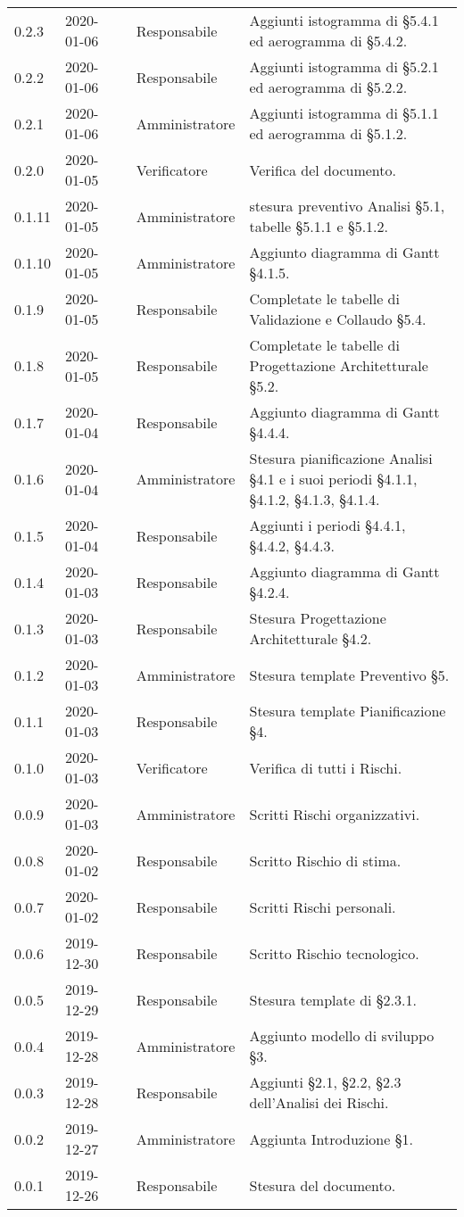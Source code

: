 {\begin{longtable}{C{2cm} C{2cm}  C{3cm}  C{3cm} C{4.4cm}}
0.2.3 & 2020-01-06 & \SE{} & Responsabile & Aggiunti istogramma di §5.4.1 ed aerogramma di §5.4.2. \\
0.2.2 & 2020-01-06 & \SE{} & Responsabile & Aggiunti istogramma di §5.2.1 ed aerogramma di §5.2.2. \\
0.2.1 & 2020-01-06 & \LD{} & Amministratore & Aggiunti istogramma di §5.1.1 ed aerogramma di §5.1.2. \\
0.2.0 & 2020-01-05 & \MC{} & Verificatore & Verifica del documento. \\
0.1.11 & 2020-01-05 & \LD{} & Amministratore & stesura preventivo Analisi §5.1, tabelle §5.1.1 e §5.1.2. \\
0.1.10 & 2020-01-05 & \LD{} & Amministratore & Aggiunto diagramma di Gantt §4.1.5. \\
0.1.9 & 2020-01-05 & \SE{} & Responsabile & Completate le tabelle di Validazione e Collaudo §5.4.\\
0.1.8 & 2020-01-05 & \SE{} & Responsabile & Completate le tabelle di Progettazione Architetturale §5.2. \\
0.1.7 & 2020-01-04 & \SE{} & Responsabile & Aggiunto diagramma di Gantt §4.4.4. \\
0.1.6 & 2020-01-04 & \LD{} & Amministratore & Stesura pianificazione Analisi §4.1 e i suoi periodi §4.1.1, §4.1.2, §4.1.3, §4.1.4. \\
0.1.5 & 2020-01-04 & \SE{} & Responsabile & Aggiunti i periodi §4.4.1, §4.4.2, §4.4.3. \\
0.1.4 & 2020-01-03 & \SE{} & Responsabile & Aggiunto diagramma di Gantt §4.2.4. \\
0.1.3 & 2020-01-03 & \SE{} & Responsabile & Stesura Progettazione Architetturale §4.2.\\
0.1.2 & 2020-01-03 & \LD{} & Amministratore & Stesura template Preventivo §5. \\
0.1.1 & 2020-01-03 & \SE{} & Responsabile & Stesura template Pianificazione §4. \\
0.1.0 & 2020-01-03 & \AT{} & Verificatore & Verifica di tutti i Rischi. \\
0.0.9 & 2020-01-03 & \LD{} & Amministratore & Scritti Rischi organizzativi. \\
0.0.8 & 2020-01-02 & \SE{} & Responsabile & Scritto Rischio di stima. \\
0.0.7 & 2020-01-02 & \SE{} & Responsabile & Scritti Rischi personali. \\
0.0.6 & 2019-12-30 & \SE{} & Responsabile & Scritto Rischio tecnologico. \\
0.0.5 & 2019-12-29 & \SE{} & Responsabile & Stesura template di §2.3.1. \\
0.0.4 & 2019-12-28 & \LD{} & Amministratore & Aggiunto modello di sviluppo §3. \\
0.0.3 & 2019-12-28 & \SE{} & Responsabile & Aggiunti §2.1, §2.2, §2.3 dell'Analisi dei Rischi. \\
0.0.2 & 2019-12-27 & \LD{} & Amministratore & Aggiunta Introduzione §1. \\
0.0.1 & 2019-12-26 & \SE{} & Responsabile & Stesura del documento. \\
		
\end{longtable}
}